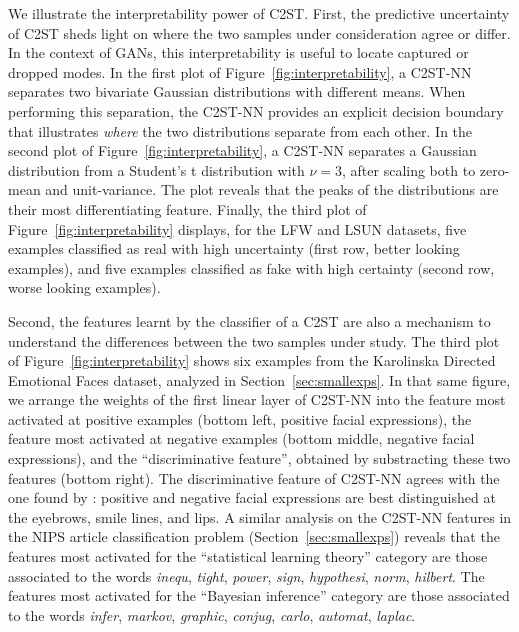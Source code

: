 \documentclass[a4paper]{article}
\begin{document}
  We illustrate the interpretability power of C2ST.
  First, the predictive uncertainty of C2ST sheds light on
  where the two samples under consideration agree or differ.
  In the context of GANs, this interpretability is useful to locate captured or dropped modes. 
  In the first plot
  of Figure~\ref{fig:interpretability}, a C2ST-NN separates two bivariate
  Gaussian
  distributions with different means. When performing this separation, the
  C2ST-NN provides an explicit decision boundary that illustrates \emph{where}
  the two distributions separate from each other. In the second plot of
  Figure~\ref{fig:interpretability}, a C2ST-NN separates a Gaussian
  distribution from a Student's t distribution with $\nu = 3$,
  after scaling both to zero-mean and unit-variance. The plot reveals that
  the peaks of the distributions are their most differentiating feature.
  Finally, the third plot of
  Figure~\ref{fig:interpretability} displays, for the LFW and LSUN datasets,
  five examples classified as real with high uncertainty (first row,
  better looking examples), and five examples classified as fake with
  high certainty (second row, worse looking examples).

  Second, the features learnt by the classifier of a C2ST 
  are also a mechanism to understand the differences between the two samples
  under study. The third plot of
  Figure~\ref{fig:interpretability} shows six examples from the Karolinska
  Directed Emotional Faces dataset, analyzed in Section~\ref{sec:smallexps}. In
  that same figure, we arrange the weights of the first linear layer of C2ST-NN
  into the feature most activated at positive examples
  (bottom left, positive facial expressions), the feature most activated at
  negative examples (bottom middle, negative facial expressions), and the
  ``discriminative feature'', obtained by substracting these two features
  (bottom right). The discriminative feature of C2ST-NN agrees with the one
  found by \citep{metests}: positive and negative facial expressions are best
  distinguished at the eyebrows, smile lines, and lips.  A similar analysis
  \cite{metests} on the C2ST-NN features in the NIPS article classification
  problem (Section~\ref{sec:smallexps}) reveals that the features most
  activated for the
  ``statistical learning theory'' category are those associated to the words
  \emph{inequ}, \emph{tight}, \emph{power}, \emph{sign}, \emph{hypothesi},
  \emph{norm}, \emph{hilbert}. The features most activated for
  the ``Bayesian inference'' category are those associated to the words
  \emph{infer}, \emph{markov}, \emph{graphic}, \emph{conjug}, \emph{carlo},
  \emph{automat}, \emph{laplac}.
\end{document}
